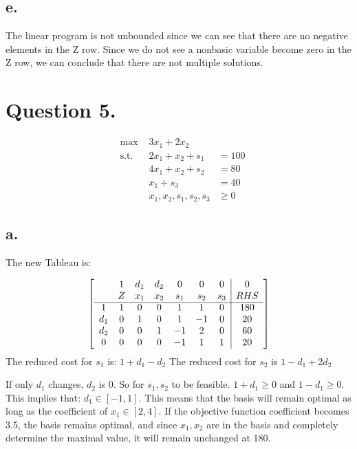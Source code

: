 \documentclass[10pt, letterpaper]{paper}
\begin{document}
\subsection*{e.}
The linear program is not unbounded since we can see that there are no negative elements in the Z row. Since we do not see a nonbasic variable become zero in the Z row, we can conclude that there are not multiple solutions.


\section*{Question 5.}
\begin{equation*}
\begin{alignedat}{3}
&\text{max }&3x_1 +2x_2&\\
&\text{s.t. } &2x_1 + x_2 + s_1 &= 100\\
& &4x_1 + x_2 + s_2  &= 80\\
& &x_1 + s_3 &= 40\\
& &x_1, x_2, s_1, s_2, s_3 &\geq 0
\end{alignedat}
\end{equation*}

\subsection*{a.}
The new Tableau is: 

\[
	\left[ {\begin{array}{ccccccc|c}
    & 1 & d_1 & d_2 & 0 & 0 & 0 & 0 \\
	  & Z & x_1 & x_2 & s_1 & s_2 & s_3 & RHS\\ \cline{1-8}
	1 &   1 & 0 & 0 & 1  & 1  & 0 & 180 \\
	d_1 & 0 & 1 & 0 & 1  & -1 & 0 & 20 \\
	d_2 & 0 & 0 & 1 & -1 & 2  & 0 & 60 \\
	0 &   0 & 0 & 0 & -1 & 1  & 1 & 20\\
	\end{array} } \right]
\]
The reduced cost for $s_1$ is: $1 + d_1 - d_2$
The reduced cost for $s_2$ is $1 - d_1 + 2d_2$

If only $d_1$ changes, $d_2$ is 0. 
So for $s_1, s_2$ to be feasible. $1+d_1 \geq 0$ and $ 1 - d_1 \geq 0$. This implies that: $d_1 \in [-1,1]$. This means that the basis will remain optimal as long as the coefficient of $x_1 \in [2,4]$. If the objective function coefficient becomes 3.5, the basis remains optimal, and since $x_1,x_2$ are in the basis and completely determine the maximal value, it will remain unchanged at 180.
\end{document}
